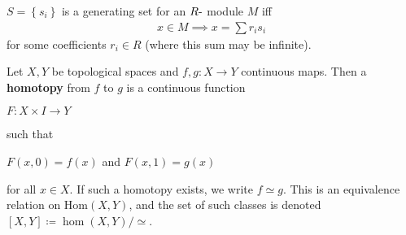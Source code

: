\begin{definition}

\(S = \left\{{s_{i}}\right\}\) is a generating set for an
\(R{\hbox{-}}\) module \(M\) iff
\begin{align*}x\in M \implies x = \sum r_{i} s_{i}\end{align*}
for some coefficients \(r_{i} \in R\) (where this sum may be infinite).

\end{definition}

\begin{definition}

\end{definition}


\begin{definition}

\end{definition}


\begin{definition}[Homologous]

\end{definition}


\begin{definition}[Homotopic]

\end{definition}


\begin{definition}[Homotopy]

Let \(X, Y\) be topological spaces and \(f,g: X \to Y\) continuous maps.
Then a \textbf{homotopy} from \(f\) to \(g\) is a continuous function

\(F: X \times I \to Y\)

such that

\(F(x, 0) = f(x)\) and \(F(x,1) = g(x)\)

for all \(x\in X\). If such a homotopy exists, we write \(f\simeq g\).
This is an equivalence relation on \(\text{Hom}(X,Y)\), and the set of
such classes is denoted \([X,Y] \coloneqq\hom (X,Y)/\simeq\).

\end{definition}

\begin{definition}

\end{definition}

